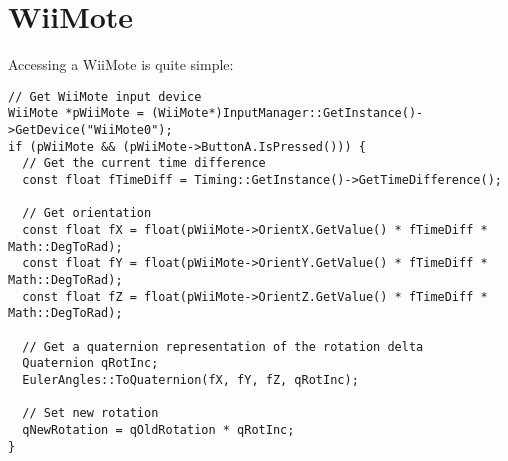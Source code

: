 \chapter{WiiMote}
Accessing a WiiMote is quite simple:

\begin{lstlisting}[caption=WiiMote usage example]
// Get WiiMote input device
WiiMote *pWiiMote = (WiiMote*)InputManager::GetInstance()->GetDevice("WiiMote0");
if (pWiiMote && (pWiiMote->ButtonA.IsPressed())) {
  // Get the current time difference
  const float fTimeDiff = Timing::GetInstance()->GetTimeDifference();

  // Get orientation
  const float fX = float(pWiiMote->OrientX.GetValue() * fTimeDiff * Math::DegToRad);
  const float fY = float(pWiiMote->OrientY.GetValue() * fTimeDiff * Math::DegToRad);
  const float fZ = float(pWiiMote->OrientZ.GetValue() * fTimeDiff * Math::DegToRad);

  // Get a quaternion representation of the rotation delta
  Quaternion qRotInc;
  EulerAngles::ToQuaternion(fX, fY, fZ, qRotInc);

  // Set new rotation
  qNewRotation = qOldRotation * qRotInc;
}
\end{lstlisting}
